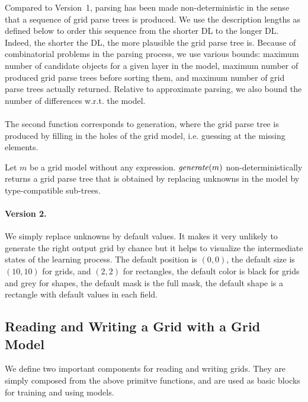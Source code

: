 \documentclass[a4paper]{llncs}
\begin{document}
Compared to Version~1, parsing has been made non-deterministic in the
sense that a sequence of grid parse trees is produced. We use the
description lengths as defined below to order this sequence from the
shorter DL to the longer DL. Indeed, the shorter the DL, the more
plausible the grid parse tree is. Because of combinatorial problems in
the parsing process, we use various bounds: maximum number of
candidate objects for a given layer in the model, maximum number of
produced grid parse trees before sorting them, and maximum number of
grid parse trees actually returned. Relative to approximate parsing,
we also bound the number of differences w.r.t. the model.

\paragraph{}
The second function corresponds to generation, where the grid parse
tree is produced by filling in the holes of the grid model,
i.e. guessing at the missing elements.

\begin{definition}
  Let $m$ be a grid model without any expression. ${\it generate}(m)$
  non-deterministically returns a grid parse tree that is obtained by
  replacing unknowns in the model by type-compatible sub-trees.
\end{definition}

\paragraph{Version 2.} We simply replace unknowns by default
values. It makes it very unlikely to generate the right output grid by
chance but it helps to visualize the intermediate states of the
learning process. The default position is $(0,0)$, the default size is
$(10,10)$ for grids, and $(2,2)$ for rectangles, the default color is
black for grids and grey for shapes, the default mask is the full
mask, the default shape is a rectangle with default values in each
field.


\subsection{Reading and Writing a Grid with a Grid Model}
\label{read:write}

We define two important components for reading and writing grids.
They are simply composed from the above primitve functions, and are
used as basic blocks for training and using models.
\end{document}
